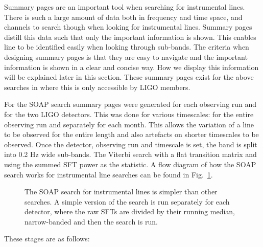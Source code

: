Summary pages are an important tool when searching for instrumental lines. 
There is such a large amount of data both in frequency and time space, and channels to search though when looking for instrumental lines.
Summary pages distill this data such that only the important information is shown.
This enables line to be identified easily when looking through sub-bands. 
The criteria when designing summary pages is that they are easy to navigate and the important information is shown in a clear and concise way.
How we display this information will be explained later in this section.
These summary pages exist for the above searches in \citep{bayleyHome} where this is only accessible by \gls{LIGO} members.

For the SOAP search summary pages were generated for each observing run and for the two \gls{LIGO} detectors. 
This was done for various timescales: for the entire observing run and separately for each month.
This allows the variation of a line to be observed for the entire length and also artefacts on shorter timescales to be observed.
Once the detector, observing run and timescale is set, the band is split into 0.2 Hz wide sub-bands. 
The Viterbi search with a flat transition matrix and using the summed \gls{SFT} power as the statistic.
A flow diagram of how the SOAP search works for instrumental line searches can be found in Fig.~\ref{detchar:summary:flow}.
%
%
\begin{figure}[hp]
	\centering
	
	
	\caption[Flow diagram for SOAP line search.]{\label{detchar:summary:flow} The SOAP search for instrumental lines is simpler than other searches. A simple version of the search is run separately for each detector, where the raw \glspl{SFT} are divided by their running median, narrow-banded and then the search is run. }
	
\end{figure} 
These stages are as follows:
